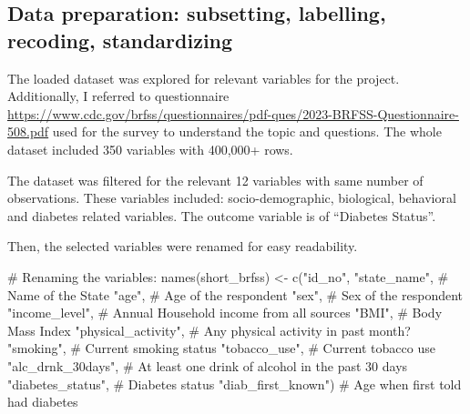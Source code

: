 \documentclass[
  letterpaper,
  DIV=11,
  numbers=noendperiod]{scrartcl}
\newenvironment{Shaded}{\begin{snugshade}}{\end{snugshade}}
\newcommand{\CommentTok}[1]{\textcolor[rgb]{0.37,0.37,0.37}{#1}}
\newcommand{\FunctionTok}[1]{\textcolor[rgb]{0.28,0.35,0.67}{#1}}
\newcommand{\NormalTok}[1]{\textcolor[rgb]{0.00,0.23,0.31}{#1}}
\newcommand{\OtherTok}[1]{\textcolor[rgb]{0.00,0.23,0.31}{#1}}
\newcommand{\StringTok}[1]{\textcolor[rgb]{0.13,0.47,0.30}{#1}}
\begin{document}
\subsection{Data preparation: subsetting, labelling, recoding,
standardizing}\label{data-preparation-subsetting-labelling-recoding-standardizing}

The loaded dataset was explored for relevant variables for the project.
Additionally, I referred to questionnaire
\url{https://www.cdc.gov/brfss/questionnaires/pdf-ques/2023-BRFSS-Questionnaire-508.pdf}
used for the survey to understand the topic and questions. The whole
dataset included 350 variables with 400,000+ rows.

The dataset was filtered for the relevant 12 variables with same number
of observations. These variables included: socio-demographic,
biological, behavioral and diabetes related variables. The outcome
variable is of ``Diabetes Status''.

Then, the selected variables were renamed for easy readability.

\begin{Shaded}
\begin{Highlighting}[]
\CommentTok{\# Renaming the variables: }
\FunctionTok{names}\NormalTok{(short\_brfss) }\OtherTok{\textless{}{-}} \FunctionTok{c}\NormalTok{(}\StringTok{"id\_no"}\NormalTok{, }
                        \StringTok{"state\_name"}\NormalTok{,        }\CommentTok{\# Name of the State}
                        \StringTok{"age"}\NormalTok{,               }\CommentTok{\# Age of the respondent}
                        \StringTok{"sex"}\NormalTok{,               }\CommentTok{\# Sex of the respondent}
                        \StringTok{"income\_level"}\NormalTok{,      }\CommentTok{\# Annual Household income from all sources}
                        \StringTok{"BMI"}\NormalTok{,               }\CommentTok{\# Body Mass Index}
                        \StringTok{"physical\_activity"}\NormalTok{, }\CommentTok{\# Any physical activity in past month?}
                        \StringTok{"smoking"}\NormalTok{,           }\CommentTok{\# Current smoking status}
                        \StringTok{"tobacco\_use"}\NormalTok{,       }\CommentTok{\# Current tobacco use}
                        \StringTok{"alc\_drnk\_30days"}\NormalTok{,   }\CommentTok{\# At least one drink of alcohol in the past 30 days}
                        \StringTok{"diabetes\_status"}\NormalTok{,   }\CommentTok{\# Diabetes status}
                        \StringTok{"diab\_first\_known"}\NormalTok{)  }\CommentTok{\# Age when first told had diabetes}
\end{Highlighting}
\end{Shaded}
\end{document}
